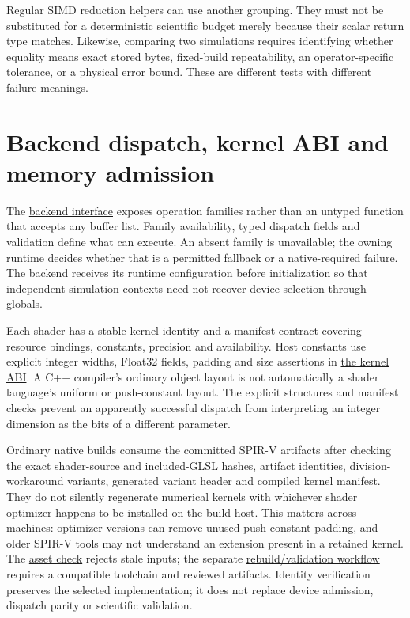 Regular SIMD reduction helpers can use another grouping. They must not be
substituted for a deterministic scientific budget merely because their scalar
return type matches. Likewise, comparing two simulations requires identifying
whether equality means exact stored bytes, fixed-build repeatability, an
operator-specific tolerance, or a physical error bound. These are different
tests with different failure meanings.

\section{Backend dispatch, kernel ABI and memory admission}

The \href{../include/compute/backend_interface.hpp}{backend interface}
exposes operation families rather than an untyped function that accepts any
buffer list. Family availability, typed dispatch fields and validation define
what can execute. An absent family is unavailable; the owning runtime decides
whether that is a permitted fallback or a native-required failure. The backend
receives its runtime configuration before initialization so that independent
simulation contexts need not recover device selection through globals.

Each shader has a stable kernel identity and a manifest contract covering
resource bindings, constants, precision and availability. Host constants use
explicit integer widths, Float32 fields, padding and size assertions in
\href{../include/compute/kernel_abi.hpp}{the kernel ABI}. A C++ compiler's
ordinary object layout is not automatically a shader language's uniform or
push-constant layout. The explicit structures and manifest checks prevent an
apparently successful dispatch from interpreting an integer dimension as the
bits of a different parameter.

Ordinary native builds consume the committed SPIR-V artifacts after checking
the exact shader-source and included-GLSL hashes, artifact identities,
division-workaround variants, generated variant header and compiled kernel
manifest. They do not silently regenerate numerical kernels with whichever
shader optimizer happens to be installed on the build host. This matters
across machines: optimizer versions can remove unused push-constant padding,
and older SPIR-V tools may not understand an extension present in a retained
kernel. The \href{../scripts/dev/shaders/check_artifacts.py}{asset check}
rejects stale inputs; the separate
\href{../scripts/dev/shaders/verify_spirv.py}{rebuild/validation workflow}
requires a compatible toolchain and reviewed artifacts. Identity verification
preserves the selected implementation; it does not replace device admission,
dispatch parity or scientific validation.


